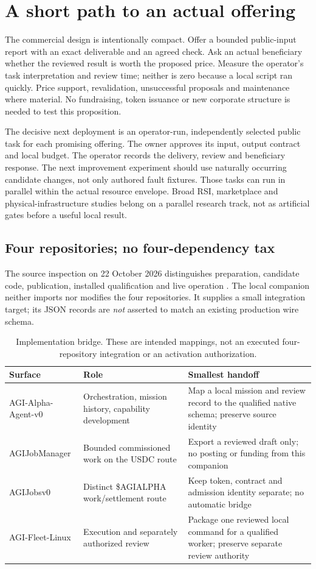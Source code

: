 \documentclass[11pt,letterpaper]{article}
\begin{document}
\section{A short path to an actual offering}
The commercial design is intentionally compact. Offer a bounded public-input report with an exact deliverable and an agreed check. Ask an actual beneficiary whether the reviewed result is worth the proposed price. Measure the operator's task interpretation and review time; neither is zero because a local script ran quickly. Price support, revalidation, unsuccessful proposals and maintenance where material. No fundraising, token issuance or new corporate structure is needed to test this proposition.

The decisive next deployment is an operator-run, independently selected public task for each promising offering. The owner approves its input, output contract and local budget. The operator records the delivery, review and beneficiary response. The next improvement experiment should use naturally occurring candidate changes, not only authored fault fixtures. Those tasks can run in parallel within the actual resource envelope. Broad RSI, marketplace and physical-infrastructure studies belong on a parallel research track, not as artificial gates before a useful local result.

\subsection{Four repositories; no four-dependency tax}
The source inspection on 22 October 2026 distinguishes preparation, candidate code, publication, installed qualification and live operation \cite{alignment,alphareadme,manager,jobs,fleet}. The local companion neither imports nor modifies the four repositories. It supplies a small integration target; its JSON records are \emph{not} asserted to match an existing production wire schema.

\begin{table}[htbp]\centering\small
\caption{Implementation bridge. These are intended mappings, not an executed four-repository integration or an activation authorization.}
\begin{tabularx}{\linewidth}{@{}P{3.2cm}YY@{}}\toprule
Surface & Role & Smallest handoff\\\midrule
AGI-Alpha-Agent-v0 & Orchestration, mission history, capability development & Map a local mission and review record to the qualified native schema; preserve source identity\\
AGIJobManager & Bounded commissioned work on the USDC route & Export a reviewed draft only; no posting or funding from this companion\\
AGIJobsv0 & Distinct \$AGIALPHA work/settlement route & Keep token, contract and admission identity separate; no automatic bridge\\
AGI-Fleet-Linux & Execution and separately authorized review & Package one reviewed local command for a qualified worker; preserve separate review authority\\\bottomrule
\end{tabularx}
\end{table}
\end{document}
